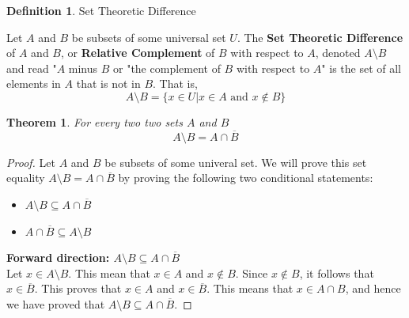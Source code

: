 \documentclass{book}
\newtheorem{theorem}{Theorem}[section]
\theoremstyle{definition}
\newtheorem{definition}{Definition}[section]
\theoremstyle{remark}
\begin{document}
\begin{definition}
Set Theoretic Difference \\
    \begin{tcolorbox}
        Let $A$ and $B$ be subsets of some universal set $U$. The \textbf{Set Theoretic Difference} \footnotemark of $A$ and $B$, or \textbf{Relative Complement} of $B$ with respect to $A$, denoted $A \setminus B$ and read "$A$ minus $B$ or "the complement of $B$ with respect to $A$" is the set of all elements in $A$ that is not in $B$. That is, \\
         \begin{equation*}
                A \setminus B = \{x \in U | x \in A \text{ and } x \notin B \}
            \end{equation*}
    \end{tcolorbox}

    \begin{tcolorbox}
        \begin{theorem}
            For every two two sets $A$ and $B$
                \begin{equation*}
                    A \setminus B = A \cap \overline{B}
                \end{equation*}
        \end{theorem}
    \end{tcolorbox}


    \begin{proof}
        Let $A$ and $B$ be subsets of some univeral set. We will prove this set equality $A \setminus B = A \cap \overline{B}$ by proving the following two conditional statements:
            \begin{itemize}
                \item $A \setminus B \subseteq A \cap \overline{B}$
                \item $A \cap \overline{B} \subseteq A \setminus B$
            \end{itemize}
        
        \textbf{Forward direction: $A \setminus B \subseteq A \cap \overline{B}$ } \\ 
            Let $x \in A \setminus B$. This mean that $x \in A$ and $x \notin B$. Since $x \notin B$, it follows that $x \in \overline{B}$. This proves that $x \in A$ and $x \in \overline{B}$. This means that $x \in A \cap B$, and hence we have proved that $A \setminus B \subseteq A \cap \overline{B}$.
        

\end{proof}
\end{definition}
\end{document}
